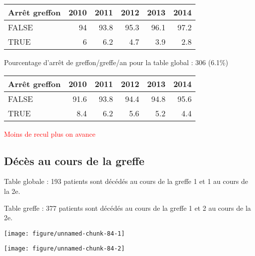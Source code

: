 \documentclass[11pt,a4paper]{article}\usepackage[]{graphicx}\usepackage[]{color}
\makeatletter
\def\maxwidth{ %
  \ifdim\Gin@nat@width>\linewidth
    \linewidth
  \else
    \Gin@nat@width
  \fi
}
\newenvironment{knitrout}{}{} %
\makeatother
\begin{document}
\begin{table}[H]
\centering
\begin{tabular}{lrrrrr}
  \hline
Arrêt greffon & 2010 & 2011 & 2012 & 2013 & 2014 \\ 
  \hline
FALSE & 94 & 93.8 & 95.3 & 96.1 & 97.2 \\ 
  TRUE & 6 & 6.2 & 4.7 & 3.9 & 2.8 \\ 
   \hline
\end{tabular}
\end{table}


Pourcentage d'arrêt de greffon/greffe/an pour la table global : 306 (6.1\%)

\begin{table}[H]
\centering
\begin{tabular}{lrrrrr}
  \hline
Arrêt greffon & 2010 & 2011 & 2012 & 2013 & 2014 \\ 
  \hline
FALSE & 91.6 & 93.8 & 94.4 & 94.8 & 95.6 \\ 
  TRUE & 8.4 & 6.2 & 5.6 & 5.2 & 4.4 \\ 
   \hline
\end{tabular}
\end{table}


\textcolor{red}{Moins de recul plus on avance}



% 

  \subsection{Décès au cours de la greffe}

Table globale : 193 patients sont décédés au cours de la greffe 1 et 1 au cours de la 2e.

Table greffe : 377 patients sont décédés au cours de la greffe 1 et 2 au cours de la 2e.

\begin{knitrout}
\color{fgcolor}
\texttt{[image: figure/unnamed-chunk-84-1]} 

\texttt{[image: figure/unnamed-chunk-84-2]} 

\end{knitrout}
\end{document}
